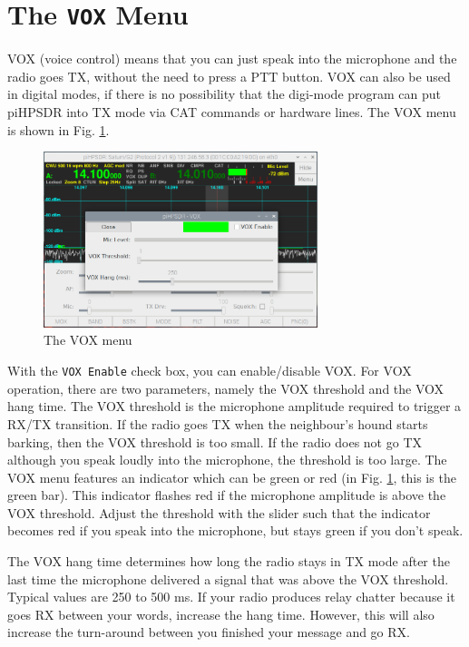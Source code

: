 \documentclass[12pt]{book}
\def\rett#1{\texttt{\color{red}#1}}
\def\pH{pi\-HPSDR\xspace}
\begin{document}
\section{The \texttt{VOX} Menu}

VOX (voice control) means that you can just speak into the microphone and the
radio goes TX, without the need to press a PTT button. VOX can also be used
in digital modes, if there is no possibility that the digi-mode program can
put \pH into TX mode via CAT commands or hardware lines. The VOX menu
is shown in Fig. \ref{fig:VOXMenu}.

\begin{figure}[ht]
\center
\includegraphics[width=8cm]{VOXMenu.png}
\caption{The VOX menu}
\label{fig:VOXMenu}
\end{figure}

With the \rett{VOX Enable} check box, you can enable/disable VOX. For VOX operation,
there are two parameters, namely the VOX threshold and the VOX hang time. The VOX threshold
is the microphone amplitude required to trigger a RX/TX transition. If the radio goes TX
when the neighbour's hound starts barking, then the VOX threshold is too small. If the radio
does not go TX  although you speak loudly into the microphone, the threshold is too large.
The VOX menu features an indicator which can be green or red (in Fig. \ref{fig:VOXMenu}, this
is the green bar). This indicator flashes red if the microphone amplitude is above the VOX
threshold. Adjust the threshold with the slider such that the indicator becomes red if  you
speak into the microphone, but stays green if you don't speak.

The VOX hang time determines how long the radio stays in TX mode after the last time the
microphone delivered a signal that was above the VOX threshold. Typical values are 250 to
500 ms. If your radio produces relay chatter because it goes RX between your words,
increase the hang time. However, this will also increase the turn-around between you finished
your message and go RX.
\end{document}
